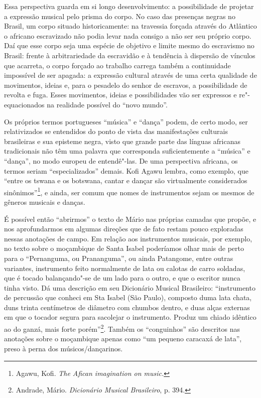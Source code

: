 Essa perspectiva guarda em si longo desenvolvimento: a possibilidade de
projetar a expressão musical pelo prisma do corpo. No caso das presenças
negras no Brasil, um corpo situado historicamente: na travessia forçada
através do Atlântico o africano escravizado não podia levar nada consigo
a não ser seu próprio corpo. Daí que esse corpo seja uma espécie de
objetivo e limite mesmo do escravismo no Brasil: frente à arbitrariedade
da escravidão e à tendência à dispersão de vínculos que acarreta, o
corpo forçado ao trabalho carrega também a continuidade impossível de
ser apagada: a expressão cultural através de uma certa qualidade de
movimentos, ideias e, para o pesadelo do senhor de escravos, a
possibilidade de revolta e fuga. Esses movimentos, ideias e
possibilidades vão ser expressos e re"-equacionados na realidade possível
do ``novo mundo''.

Os próprios termos portugueses ``música'' e ``dança'' podem, de certo
modo, ser relativizados se entendidos do ponto de vista das
manifestações culturais brasileiras e sua episteme negra, visto que
grande parte das línguas africanas tradicionais não têm uma palavra que
corresponda suficientemente a ``música'' e ``dança'', no modo europeu de
entendê"-las. De uma perspectiva africana, os termos seriam
``especializados'' demais. Kofi Agawu lembra, como exemplo, que ``entre
os tswana e os botswana, cantar e dançar são virtualmente considerados
sinônimos''\footnote{Agawu, Kofi. \emph{The Afican imagination on
  music.}}, e ainda, ser comum que nomes de instrumentos sejam os mesmos
de gêneros musicais e danças.

É possível então ``abrirmos'' o texto de Mário nas próprias camadas que
propõe, e nos aprofundarmos em algumas direções que de fato restam pouco
exploradas nessas anotações de campo. Em relação aos instrumentos
musicais, por exemplo, no texto sobre o moçambique de Santa Isabel
poderíamos olhar mais de perto para o ``Pernanguma, ou Prananguma'', ou
ainda Patangome, entre outras variantes, instrumento feito normalmente
de lata ou calotas de carro soldadas, que é tocado balançando"-se de um
lado para o outro, e que o escritor nunca tinha visto. Dá uma descrição
em seu Dicionário Musical Brasileiro: ``instrumento de percussão que
conheci em Sta Isabel (São Paulo), composto duma lata chata, duns trinta
centímetros de diâmetro com chumbos dentro, e duas alças externas em que
o tocador segura para sacolejar o instrumento. Produz um chiado idêntico
ao do ganzá, mais forte porém''\footnote{Andrade, Mário.
  \emph{Dicionário Musical Brasileiro}, p. 394.}. Também os
``conguinhos'' são descritos nas anotações sobre o moçambique apenas
como ``um pequeno caracaxá de lata'', preso à perna dos
músicos/dançarinos.

